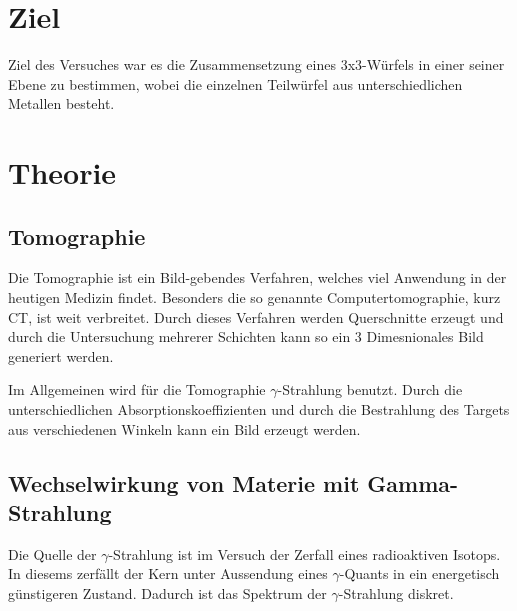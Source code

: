 \section{Ziel}
Ziel des Versuches war es die Zusammensetzung eines 3x3-Würfels in einer seiner Ebene zu bestimmen, wobei die einzelnen Teilwürfel aus unterschiedlichen Metallen besteht. 

\section{Theorie}
\subsection{Tomographie}
Die Tomographie ist ein Bild-gebendes Verfahren, welches viel Anwendung in der heutigen Medizin findet. Besonders die so genannte Computertomographie, kurz CT, ist weit 
verbreitet.
Durch dieses Verfahren werden Querschnitte erzeugt und durch die Untersuchung mehrerer Schichten kann so ein 3 Dimesnionales Bild generiert werden.

\noindent
Im Allgemeinen wird für die Tomographie $\gamma$-Strahlung benutzt. Durch die unterschiedlichen Absorptionskoeffizienten und durch die Bestrahlung des Targets aus 
verschiedenen Winkeln kann ein Bild erzeugt werden.

\subsection{Wechselwirkung von Materie mit Gamma-Strahlung}
Die Quelle der $\gamma$-Strahlung ist im Versuch der Zerfall eines radioaktiven Isotops. In diesems zerfällt
der Kern unter Aussendung eines $\gamma$-Quants in ein energetisch günstigeren Zustand. Dadurch ist das 
Spektrum der $\gamma$-Strahlung diskret.

